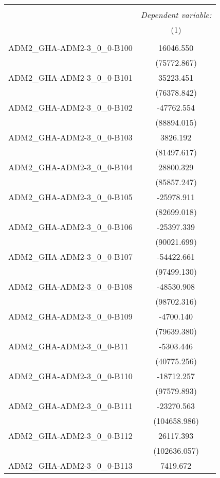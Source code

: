 \begin{table}[!htbp] \centering
\begin{tabular}{@{\extracolsep{5pt}}lc}
\\[-1.8ex]\hline
\hline \\[-1.8ex]
& \multicolumn{1}{c}{\textit{Dependent variable:}} \
\cr \cline{1-2}
\\[-1.8ex] & (1) \\
\hline \\[-1.8ex]
 ADM2_GHA-ADM2-3_0_0-B100 & 16046.550$^{}$ \\
  & (75772.867) \\
 ADM2_GHA-ADM2-3_0_0-B101 & 35223.451$^{}$ \\
  & (76378.842) \\
 ADM2_GHA-ADM2-3_0_0-B102 & -47762.554$^{}$ \\
  & (88894.015) \\
 ADM2_GHA-ADM2-3_0_0-B103 & 3826.192$^{}$ \\
  & (81497.617) \\
 ADM2_GHA-ADM2-3_0_0-B104 & 28800.329$^{}$ \\
  & (85857.247) \\
 ADM2_GHA-ADM2-3_0_0-B105 & -25978.911$^{}$ \\
  & (82699.018) \\
 ADM2_GHA-ADM2-3_0_0-B106 & -25397.339$^{}$ \\
  & (90021.699) \\
 ADM2_GHA-ADM2-3_0_0-B107 & -54422.661$^{}$ \\
  & (97499.130) \\
 ADM2_GHA-ADM2-3_0_0-B108 & -48530.908$^{}$ \\
  & (98702.316) \\
 ADM2_GHA-ADM2-3_0_0-B109 & -4700.140$^{}$ \\
  & (79639.380) \\
 ADM2_GHA-ADM2-3_0_0-B11 & -5303.446$^{}$ \\
  & (40775.256) \\
 ADM2_GHA-ADM2-3_0_0-B110 & -18712.257$^{}$ \\
  & (97579.893) \\
 ADM2_GHA-ADM2-3_0_0-B111 & -23270.563$^{}$ \\
  & (104658.986) \\
 ADM2_GHA-ADM2-3_0_0-B112 & 26117.393$^{}$ \\
  & (102636.057) \\
 ADM2_GHA-ADM2-3_0_0-B113 & 7419.672$^{}$ \\

\end{tabular}
\end{table}
